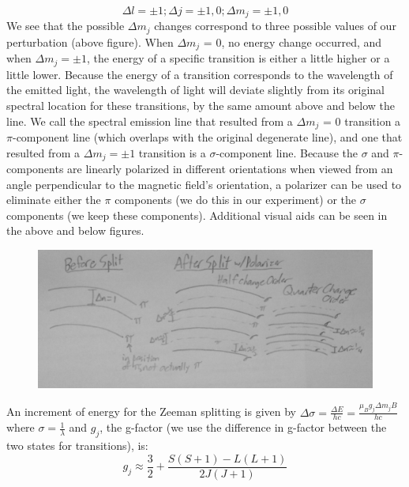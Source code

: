 \documentclass{article}
\begin{document}
    \begin{equation}
        \Delta l = \pm 1; \Delta j = \pm 1, 0; \Delta m_j = \pm 1, 0
    \end{equation}
    We see that the possible $\Delta m_j$ changes correspond to three possible values of our perturbation (above figure). When $\Delta m_j$ = 0, no energy change occurred, and when $\Delta m_j = \pm 1$, the energy of a specific transition is either a little higher or a little lower. Because the energy of a transition corresponds to the wavelength of the emitted light, the wavelength of light will deviate slightly from its original spectral location for these transitions, by the same amount above and below the line. We call the spectral emission line that resulted from a $\Delta m_j$ = 0 transition a $\pi$-component line (which overlaps with the original degenerate line), and one that resulted from a $\Delta m_j = \pm 1$ transition is a $\sigma$-component line. Because the $\sigma$ and $\pi$-components are linearly polarized in different orientations when viewed from an angle perpendicular to the magnetic field's orientation, a polarizer can be used to eliminate either the $\pi$ components (we do this in our experiment) or the $\sigma$ components (we keep these components). Additional visual aids can be seen in the above and below figures. \begin{figure}[H]
    \centering
    \includegraphics[scale = 0.2]{ATMn.jpg}
    \caption{}
    \label{fig:my_label}
\end{figure}
    An increment of energy for the Zeeman splitting is given by $\Delta \sigma = \frac{\Delta E}{hc} = \frac{\mu_B g_j \Delta m_j B}{hc}$ where $\sigma = \frac{1}{\lambda}$ and $g_j$, the g-factor (we use the difference in g-factor between the two states for transitions), is:
    \begin{equation}
        g_j \approx \frac{3}{2} + \frac{S(S+1) - L(L+1)}{2J(J+1)}
    \end{equation}
\end{document}
